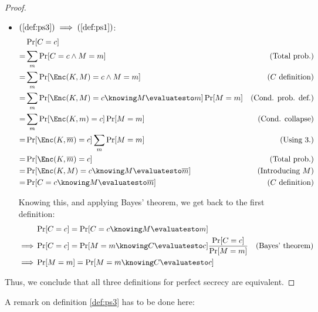 \begin{proof}
\begin{itemize}
        \item $(\ref{def:ps3}) \implies (\ref{def:ps1})$:
        \begin{align*}
            & \Pr[C = c] & \\
            =& \sum_{m}\Pr[C = c \wedge M = m]                                  & \text{(Total prob.)} \\
            =& \sum_{m}\Pr[\Enc(K, M) = c \wedge M = m]                         & \text{($C$ definition)} \\
            =& \sum_{m}\Pr[\Enc(K, M) = c \knowing M \evaluatesto m] \Pr[M = m] & \text{(Cond. prob. def.)} \\
            =& \sum_{m}\Pr[\Enc(K, m) = c] \Pr[M = m]                           & \text{(Cond. collapse)} \\
            =& \Pr[\Enc(K, \overline{m}) = c] \sum_{m} \Pr[M = m]               & \text{(Using 3.)} \\ %
            =& \Pr[\Enc(K, \overline{m}) = c]                                   & \text{(Total prob.)} \\
            =& \Pr[\Enc(K, M) = c \knowing M \evaluatesto \overline{m}]         & \text{(Introducing $M$)} \\
            =& \Pr[C = c \knowing M \evaluatesto \overline{m}]                  & \text{($C$ definition)} \\
        \end{align*}

        Knowing this, and applying Bayes' theorem, we get back to the first definition:
        \begin{align*}
            & \Pr[C = c] = \Pr[C = c \knowing M \evaluatesto m]                                         & \\
            \implies& \Pr[C = c] = \Pr[M = m \knowing C \evaluatesto c] \frac{\Pr[C = c]}{\Pr[M = m]}   & \text{(Bayes' theorem)} \\
            \implies& \Pr[M = m] = \Pr[M = m \knowing C \evaluatesto c]                                 & \\
        \end{align*}

    \end{itemize}

    Thus, we conclude that all three definitions for perfect secrecy are equivalent.

\end{proof}

A remark on definition \ref{def:ps3} has to be done here:

